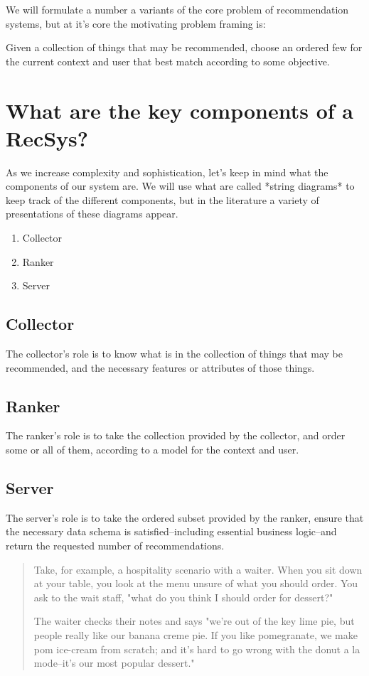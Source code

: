 We will formulate a number a variants of the core problem of recommendation systems, but at it's core the motivating problem framing is:


Given a collection of things that may be recommended, choose an ordered few for the current context and user that best match according to some objective.


\section{What are the key components of a RecSys?}

As we increase complexity and sophistication, let's keep in mind what the components of our system are. We will use what are called *string diagrams* to keep track of the different components, but in the literature a variety of presentations of these diagrams appear.

\begin{enumerate}
    \item Collector
    \item Ranker
    \item Server
\end{enumerate}


\subsection{Collector}

The collector's role is to know what is in the collection of things that may be recommended, and the necessary features or attributes of those things.

\subsection{Ranker}

The ranker's role is to take the collection provided by the collector, and order some or all of them, according to a model for the context and user.

\subsection{Server}

The server's role is to take the ordered subset provided by the ranker, ensure that the necessary data schema is satisfied–including essential business logic–and return the requested number of recommendations. 

\begin{quote}
    Take, for example, a hospitality scenario with a waiter. When you sit down at your table, you look at the menu unsure of what you should order. You ask to the wait staff, "what do you think I should order for dessert?"
    
    The waiter checks their notes and says "we're out of the key lime pie, but people really like our banana creme pie. If you like pomegranate, we make pom ice-cream from scratch; and it's hard to go wrong with the donut a la mode–it's our most popular dessert."
\end{quote} 


